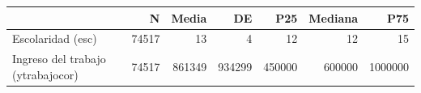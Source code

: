 \begin{table}
\centering
\begin{tabular}[t]{lrrrrrr}
\toprule
  & N & Media & DE & P25 & Mediana & P75\\
\midrule
Escolaridad (esc) & 74517 & 13 & 4 & 12 & 12 & 15\\
Ingreso del trabajo (ytrabajocor) & 74517 & 861349 & 934299 & 450000 & 600000 & 1000000\\
\bottomrule
\end{tabular}
\end{table}
